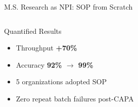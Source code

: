 \documentclass[aspectratio=169,10pt]{beamer}
\begin{document}
\begin{frame}{M.S. Research as NPI: SOP from Scratch}
\begin{columns}[T]
      \begin{alertblock}{Quantified Results}
        \small
        \begin{itemize}
          \item Throughput \textbf{+70\%}
          \item Accuracy \textbf{92\% $\to$ 99\%}
          \item 5 organizations adopted SOP
          \item Zero repeat batch failures post-CAPA
        \end{itemize}
      \end{alertblock}
  \end{columns}
\end{frame}

\end{document}
